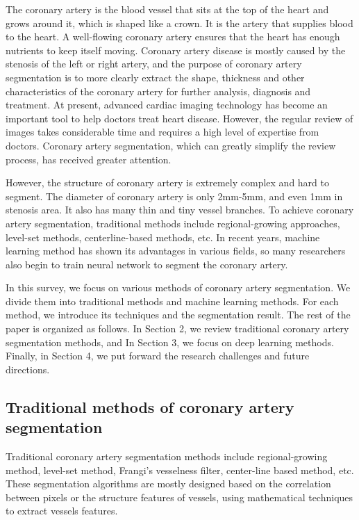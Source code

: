 \documentclass[lang=cn,11pt,a4paper,cite=numbers]{elegantpaper}
\begin{document}
The coronary artery is the blood vessel that sits at the top of the heart and grows around it, which is shaped like a crown. It is the artery that supplies blood to the heart. A well-flowing coronary artery ensures that the heart has enough nutrients to keep itself moving. Coronary artery disease is mostly caused by the stenosis of the left or right artery, and the purpose of coronary artery segmentation is to more clearly extract the shape, thickness and other characteristics of the coronary artery for further analysis, diagnosis and treatment.  At present, advanced cardiac imaging technology has become an important tool to help doctors treat heart disease. However, the regular review of images takes considerable time and requires a high level of expertise from doctors. Coronary artery segmentation, which can greatly simplify the review process, has received greater attention.
	
However, the structure of coronary artery is extremely complex and hard to segment. The diameter of coronary artery is only 2mm-5mm, and even 1mm in stenosis area. It also has many thin and tiny vessel branches. To achieve coronary artery segmentation, traditional methods include regional-growing approaches, level-set methods, centerline-based methods, etc. In recent years, machine learning method has shown its advantages in various fields, so many researchers also begin to train neural network to segment the coronary artery.
	
In this survey, we focus on various methods of coronary artery segmentation. We divide them into traditional methods and machine learning methods. For each method, we introduce its techniques and the segmentation result. The rest of the paper is organized as follows. In Section 2, we review traditional coronary artery segmentation methods, and In Section 3, we focus on deep learning methods. Finally, in Section 4, we put forward the research challenges and future directions.


\subsection{Traditional methods of coronary artery segmentation}

Traditional coronary artery segmentation methods include regional-growing method, level-set method, Frangi’s vesselness filter, center-line based method, etc. These segmentation algorithms are mostly designed based on the correlation between pixels or the structure features of vessels, using mathematical techniques to extract vessels features. 
\end{document}
